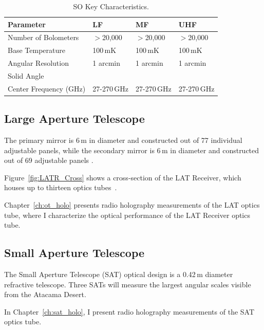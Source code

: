 \begin{table}[ht]
    \centering
    \begin{tabular}{|l|l|l|l|} \hline
        \textbf{ Parameter} &  \textbf{LF} &  \textbf{MF}  &  \textbf{UHF}  \\ \hline \hline
        Number of Bolometers & $>$20,000& $>$20,000& $>$20,000\\\hline
        Base Temperature & 100\,mK & 100\,mK & 100\,mK\\\hline
        Angular Resolution & 1 arcmin &1 arcmin &1 arcmin\\\hline
        Solid Angle & & &\\\hline
        Center Frequency (GHz) & 27-270\,GHz & 27-270\,GHz & 27-270\,GHz\\\hline
    \end{tabular} \caption{SO Key Characteristics.}
    \label{tab:so}
\end{table}

\subsection{Large Aperture Telescope}

The primary mirror is 6\,m in diameter and constructed out of 77 individual adjustable panels, while the secondary mirror is 6\,m in diameter and constructed out of 69 adjustable panels \cite{gali18}.

Figure~\ref{fig:LATR_Cross} shows a cross-section of the LAT Receiver, which houses up to thirteen optics tubes~\cite{Xu_2021}.

Chapter~\ref{ch:ot_holo} presents radio holography measurements of the LAT optics tube, where I characterize the optical performance of the LAT Receiver optics tube.

\subsection{Small Aperture Telescope}

The Small Aperture Telescope (SAT) optical design is a 0.42\,m diameter refractive telescope.  Three SATs will measure the largest angular scales visible from the Atacama Desert.

In Chapter~\ref{ch:sat_holo}, I present radio holography measurements of the SAT optics tube.